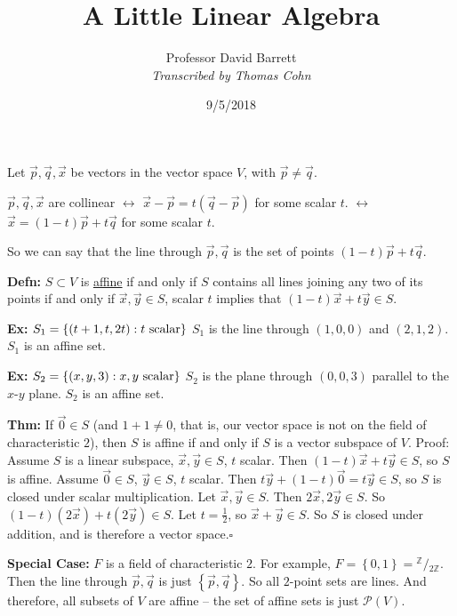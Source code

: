 \documentclass[10pt,letterpaper]{article}
\author{Professor David Barrett\\ \small\textit{Transcribed by Thomas Cohn}}
\title{A Little Linear Algebra}
\date{9/5/2018} %
\newcommand{\n}{\hfill\break}
\newcommand{\defn}[1]{\par\noindent\settowidth{\hangindent}{\textbf{Defn: }}\textbf{Defn: }#1\n}
\newcommand{\thm}[1]{\par\noindent\settowidth{\hangindent}{\textbf{Thm: }}\textbf{Thm: }#1\n}
\newcommand{\ex}[1]{\par\noindent\settowidth{\hangindent}{\textbf{Ex: }}\textbf{Ex: }#1\n}
\newcommand{\proven}{\;$\square$\n}
\newcommand{\ptxt}[1]{\textrm{\textnormal{#1}}}
\newcommand{\set}[1]{\left\{#1\right\}}
\newcommand{\ps}[1]{\mathcal{P}(#1)}
\newcommand{\integers}{\mathbb{Z}}
\newcommand{\Z}{\integers}
\begin{document}
\maketitle
\setlength\RaggedRightParindent{\parindent}
\RaggedRight

\par\noindent Let $\vec{p},\vec{q},\vec{x}$ be vectors in the vector space $V$, with $\vec{p}\ne\vec{q}$.\n

\par\noindent $\vec{p},\vec{q},\vec{x}$ are collinear $\leftrightarrow$ $\vec{x}-\vec{p}=t(\vec{q}-\vec{p})$ for some scalar $t$.\n
{}$\leftrightarrow$ $\vec{x}=(1-t)\vec{p}+t\vec{q}$ for some scalar $t$.\n

\par\noindent So we can say that the line through $\vec{p},\vec{q}$ is the set of points $(1-t)\vec{p}+t\vec{q}$.\n

\defn{$S\subset{}V$ is \underline{affine} if and only if $S$ contains all lines joining any two of its points if and only if $\vec{x},\vec{y}\in{}S$, scalar $t$ implies that $(1-t)\vec{x}+t\vec{y}\in{}S$.}

\ex{$S_{1}=\set{(t+1,t,2t):t\ptxt{ scalar}}$\n
$S_{1}$ is the line through $(1,0,0)$ and $(2,1,2)$.\n
$S_{1}$ is an affine set.}

\ex{$S_{2}=\set{(x,y,3):x,y\ptxt{ scalar}}$\n
$S_{2}$ is the plane through $(0,0,3)$ parallel to the $x$-$y$ plane.\n
$S_{2}$ is an affine set.}

\thm{If $\vec{0}\in{}S$ (and $1+1\ne{}0$, that is, our vector space is not on the field of characteristic $2$), then $S$ is affine if and only if $S$ is a vector subspace of $V$.\n
Proof: Assume $S$ is a linear subspace, $\vec{x},\vec{y}\in{}S$, $t$ scalar. Then $(1-t)\vec{x}+t\vec{y}\in{}S$, so $S$ is affine.\n
\phantom{Proof: }Assume $\vec{0}\in{}S$, $\vec{y}\in{}S$, $t$ scalar. Then $t\vec{y}+(1-t)\vec{0}=t\vec{y}\in{}S$, so $S$ is closed under scalar\n
\phantom{Proof: }multiplication. Let $\vec{x},\vec{y}\in{}S$. Then $2\vec{x},2\vec{y}\in{}S$. So $(1-t)(2\vec{x})+t(2\vec{y})\in{}S$. Let $t=\frac{1}{2}$, so\n
\phantom{Proof: }$\vec{x}+\vec{y}\in{}S$. So $S$ is closed under addition, and is therefore a vector space.\proven}

\par\noindent\textbf{Special Case:} $F$ is a field of characteristic $2$. For example, $F=\set{0,1}={}^{\Z}/{}_{2\Z}$. Then the line through $\vec{p},\vec{q}$ is just $\set{\vec{p},\vec{q}}$. So all $2$-point sets are lines. And therefore, all subsets of $V$ are affine -- the set of affine sets is just $\ps{V}$.\n
\end{document}
